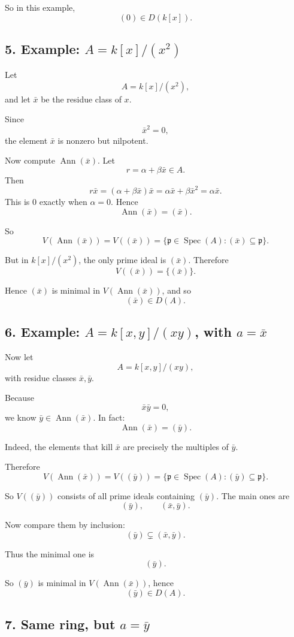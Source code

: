 \documentclass[12pt,a4paper]{article}
\theoremstyle{notespace}
\DeclareMathOperator{\Spec}{Spec}
\DeclareMathOperator{\Ann}{Ann}
\begin{document}
So in this example,
\[
(0)\in D(k[x]).
\]

\subsection*{5. Example: \(A=k[x]/(x^2)\)}

Let
\[
A=k[x]/(x^2),
\]
and let \(\bar x\) be the residue class of \(x\).

Since
\[
\bar x^2=0,
\]
the element \(\bar x\) is nonzero but nilpotent.

Now compute \(\Ann(\bar x)\). Let
\[
r=\alpha+\beta \bar x \in A.
\]
Then
\[
r\bar x=(\alpha+\beta \bar x)\bar x
= \alpha \bar x+\beta \bar x^2
= \alpha \bar x.
\]
This is \(0\) exactly when \(\alpha=0\). Hence
\[
\Ann(\bar x)=(\bar x).
\]

So
\[
V(\Ann(\bar x))=V((\bar x))
=\{\mathfrak p\in \Spec(A): (\bar x)\subseteq \mathfrak p\}.
\]

But in \(k[x]/(x^2)\), the only prime ideal is \((\bar x)\). Therefore
\[
V((\bar x))=\{(\bar x)\}.
\]

Hence \((\bar x)\) is minimal in \(V(\Ann(\bar x))\), and so
\[
(\bar x)\in D(A).
\]

\subsection*{6. Example: \(A=k[x,y]/(xy)\), with \(a=\bar x\)}

Now let
\[
A=k[x,y]/(xy),
\]
with residue classes \(\bar x,\bar y\).

Because
\[
\bar x\bar y=0,
\]
we know \(\bar y\in \Ann(\bar x)\). In fact:
\[
\Ann(\bar x)=(\bar y).
\]

Indeed, the elements that kill \(\bar x\) are precisely the multiples of \(\bar y\).

Therefore
\[
V(\Ann(\bar x))=V((\bar y))
=\{\mathfrak p\in \Spec(A): (\bar y)\subseteq \mathfrak p\}.
\]

So \(V((\bar y))\) consists of all prime ideals containing \((\bar y)\). The main ones are
\[
(\bar y), \qquad (\bar x,\bar y).
\]

Now compare them by inclusion:
\[
(\bar y)\subsetneq (\bar x,\bar y).
\]

Thus the minimal one is
\[
(\bar y).
\]

So \((\bar y)\) is minimal in \(V(\Ann(\bar x))\), hence
\[
(\bar y)\in D(A).
\]

\subsection*{7. Same ring, but \(a=\bar y\)}
\end{document}
